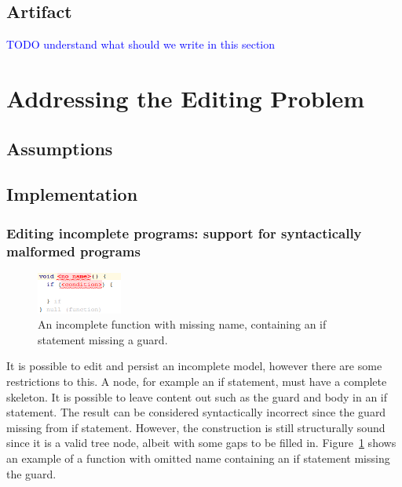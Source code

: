 \documentclass[preprint,numbers,10pt]{sigplanconf}
\newcommand\comment[1]{\textcolor{blue}{#1}}
\begin{document}
\subsection{Artifact}

\comment{TODO understand what should we write in this section}

%
%

\section{Addressing the Editing Problem}

\subsection{Assumptions}

\subsection{Implementation}

\subsubsection{Editing incomplete programs: support for syntactically malformed programs}
\begin{figure}[H]
	\centering
	\includegraphics[width=0.25\textwidth]{screens/IncompleteNode.png}
	\caption{An incomplete function with missing name, containing an if statement missing a guard.}
	\label{fig:IncompleteNode}
\end{figure}

It is possible to edit and persist an incomplete model, however there are some restrictions to this. A node, for example an if statement, must have a complete skeleton. It is possible to leave content out such as the guard and body in an if statement. The result can be considered syntactically incorrect since the guard missing from if statement. However, the construction is still structurally sound since it is a valid tree node, albeit with some gaps to be filled in. Figure~\ref{fig:IncompleteNode} shows an example of a function with omitted name containing an if statement missing the guard. 
\end{document}
